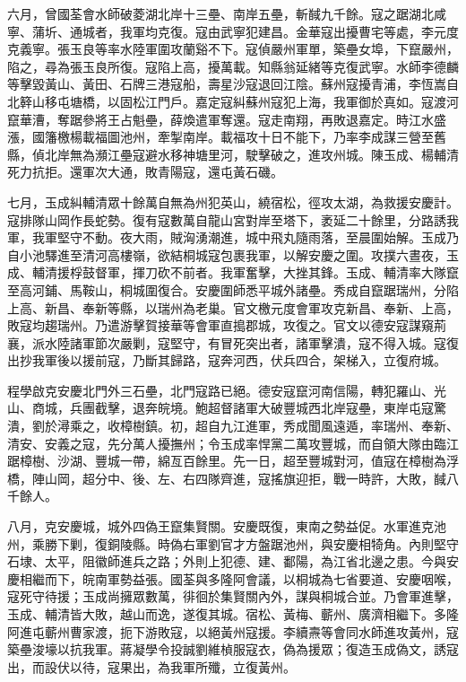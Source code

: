 \begin{pinyinscope}
六月，曾國荃會水師破菱湖北岸十三壘、南岸五壘，斬馘九千餘。寇之踞湖北咸寧、蒲圻、通城者，我軍均克復。寇由武寧犯建昌。金華寇出擾曹宅等處，李元度克義寧。張玉良等率水陸軍圍攻蘭谿不下。寇偵嚴州軍單，築壘女埠，下竄嚴州，陷之，尋為張玉良所復。寇陷上高，擾萬載。知縣翁延緒等克復武寧。水師李德麟等擊毀黃山、黃田、石牌三港寇船，壽星沙寇退回江陰。蘇州寇擾青浦，李恆嵩自北簳山移屯塘橋，以固松江門戶。嘉定寇糾蘇州寇犯上海，我軍御於真如。寇渡河竄華漕，奪踞參將王占魁壘，薛煥遣軍奪還。寇走南翔，再敗退嘉定。時江水盛漲，國籓檄楊載福圖池州，牽掣南岸。載福攻十日不能下，乃率李成謀三營至舊縣，偵北岸無為瀕江壘寇避水移神塘里河，駛擊破之，進攻州城。陳玉成、楊輔清死力抗拒。還軍次大通，敗青陽寇，還屯黃石磯。

七月，玉成糾輔清眾十餘萬自無為州犯英山，繞宿松，徑攻太湖，為救援安慶計。寇排隊山岡作長蛇勢。復有寇數萬自龍山宮對岸至塔下，袤延二十餘里，分路誘我軍，我軍堅守不動。夜大雨，賊洶湧潮進，城中飛丸隨雨落，至晨圍始解。玉成乃自小池驛進至清河高樓嶺，欲結桐城寇包裹我軍，以解安慶之圍。攻撲六晝夜，玉成、輔清援桴鼓督軍，揮刀砍不前者。我軍奮擊，大挫其鋒。玉成、輔清率大隊竄至高河鋪、馬鞍山，桐城圍復合。安慶圍師悉平城外諸壘。秀成自竄踞瑞州，分陷上高、新昌、奉新等縣，以瑞州為老巢。官文檄元度會軍攻克新昌、奉新、上高，敗寇均趨瑞州。乃遣游擊賀接華等會軍直搗郡城，攻復之。官文以德安寇謀窺荊襄，派水陸諸軍節次嚴剿，寇堅守，有冒死突出者，諸軍擊潰，寇不得入城。寇復出抄我軍後以援前寇，乃斷其歸路，寇奔河西，伏兵四合，架梯入，立復府城。

程學啟克安慶北門外三石壘，北門寇路已絕。德安寇竄河南信陽，轉犯羅山、光山、商城，兵團截擊，退奔皖境。鮑超督諸軍大破豐城西北岸寇壘，東岸屯寇驚潰，劉於潯乘之，收樟樹鎮。初，超自九江進軍，秀成聞風遠遁，率瑞州、奉新、清安、安義之寇，先分萬人擾撫州；令玉成率悍黨二萬攻豐城，而自領大隊由臨江踞樟樹、沙湖、豐城一帶，綿亙百餘里。先一日，超至豐城對河，值寇在樟樹為浮橋，陣山岡，超分中、後、左、右四隊齊進，寇搖旗迎拒，戰一時許，大敗，馘八千餘人。

八月，克安慶城，城外四偽王竄集賢關。安慶既復，東南之勢益促。水軍進克池州，乘勝下剿，復銅陵縣。時偽右軍劉官才方盤踞池州，與安慶相犄角。內則堅守石埭、太平，阻徽師進兵之路；外則上犯德、建、鄱陽，為江省北邊之患。今與安慶相繼而下，皖南軍勢益張。國荃與多隆阿會議，以桐城為七省要道、安慶咽喉，寇死守待援；玉成尚擁眾數萬，徘徊於集賢關內外，謀與桐城合並。乃會軍進擊，玉成、輔清皆大敗，越山而逸，遂復其城。宿松、黃梅、蘄州、廣濟相繼下。多隆阿進屯蘄州曹家渡，扼下游敗寇，以絕黃州寇援。李續燾等會同水師進攻黃州，寇築壘浚壕以抗我軍。蔣凝學令投誠劉維楨服寇衣，偽為援眾；復造玉成偽文，誘寇出，而設伏以待，寇果出，為我軍所殲，立復黃州。


\end{pinyinscope}
